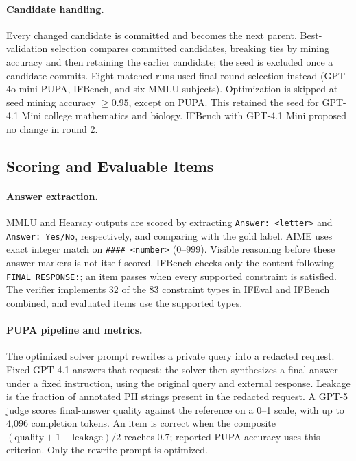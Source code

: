 \documentclass[11pt]{article}
\begin{document}
\paragraph{Candidate handling.}
Every changed candidate is committed and becomes the next parent. Best-validation selection compares committed
candidates, breaking ties by mining accuracy and then retaining the earlier candidate; the seed is excluded once a
candidate commits. Eight matched runs used final-round selection instead (GPT-4o-mini PUPA, IFBench, and six MMLU
subjects). Optimization is skipped at seed mining accuracy $\geq 0.95$, except on PUPA. This retained the seed for
GPT-4.1 Mini college mathematics and biology. IFBench with GPT-4.1 Mini proposed no change in round 2.

\FloatBarrier
\subsection{Scoring and Evaluable Items}
\label{app:eval}
\paragraph{Answer extraction.}
MMLU and Hearsay outputs are scored by extracting \texttt{Answer: <letter>} and \texttt{Answer: Yes/No}, respectively,
and comparing with the gold label. AIME uses exact integer match on \texttt{\#\#\#\# <number>} (0--999). Visible
reasoning before these answer markers is not itself scored. IFBench checks only the content following
\texttt{FINAL RESPONSE:}; an item passes when every supported constraint is satisfied. The verifier implements 32
of the 83 constraint types in IFEval and IFBench combined, and evaluated items use the supported types.

\paragraph{PUPA pipeline and metrics.}
The optimized solver prompt rewrites a private query into a redacted request. Fixed GPT-4.1 answers that request;
the solver then synthesizes a final answer under a fixed instruction, using the original query and external response.
Leakage is the fraction of annotated PII strings present in the redacted request. A GPT-5 judge scores final-answer
quality against the reference on a 0--1 scale, with up to 4,096 completion tokens. An item is correct when the
composite $(\text{quality}+1-\text{leakage})/2$ reaches 0.7; reported PUPA accuracy uses this criterion. Only the
rewrite prompt is optimized.
\end{document}
